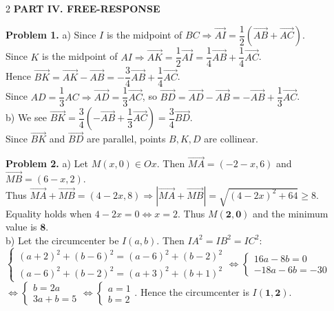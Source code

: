 \documentclass[10pt,a4paper]{article}
\begin{document}
\begin{multicols}{2}
\textbf{\color{accent}PART IV. FREE-RESPONSE}

\textbf{Problem 1.}
a) Since $I$ is the midpoint of $BC \Rightarrow \vec{AI} = \dfrac{1}{2}(\vec{AB} + \vec{AC})$.\\
Since $K$ is the midpoint of $AI \Rightarrow \vec{AK} = \dfrac{1}{2}\vec{AI} = \dfrac{1}{4}\vec{AB} + \dfrac{1}{4}\vec{AC}$.\\
Hence $\vec{BK} = \vec{AK} - \vec{AB} = -\dfrac{3}{4}\vec{AB} + \dfrac{1}{4}\vec{AC}$.\\
Since $AD = \dfrac{1}{3}AC \Rightarrow \vec{AD} = \dfrac{1}{3}\vec{AC}$, so $\vec{BD} = \vec{AD} - \vec{AB} = -\vec{AB} + \dfrac{1}{3}\vec{AC}$.\\
b) We see $\vec{BK} = \dfrac{3}{4}\left(-\vec{AB} + \dfrac{1}{3}\vec{AC}\right) = \dfrac{3}{4}\vec{BD}$.\\
Since $\vec{BK}$ and $\vec{BD}$ are parallel, points $B, K, D$ are collinear.

\textbf{Problem 2.}
a) Let $M(x, 0) \in Ox$. Then $\vec{MA} = (-2 - x, 6)$ and $\vec{MB} = (6 - x, 2)$.\\
Thus $\vec{MA} + \vec{MB} = (4 - 2x, 8) \Rightarrow |\vec{MA} + \vec{MB}| = \sqrt{(4 - 2x)^2 + 64} \ge 8$.\\
Equality holds when $4 - 2x = 0 \Leftrightarrow x = 2$. Thus $M(\mathbf{2}, \mathbf{0})$ and the minimum value is $\mathbf{8}$.\\
b) Let the circumcenter be $I(a, b)$. Then $IA^2 = IB^2 = IC^2$:\\
$\begin{cases} (a + 2)^2 + (b - 6)^2 = (a - 6)^2 + (b - 2)^2 \\ (a - 6)^2 + (b - 2)^2 = (a + 3)^2 + (b + 1)^2 \end{cases} \Leftrightarrow \begin{cases} 16a - 8b = 0 \\ -18a - 6b = -30 \end{cases}$\\
$\Leftrightarrow \begin{cases} b = 2a \\ 3a + b = 5 \end{cases} \Leftrightarrow \begin{cases} a = 1 \\ b = 2 \end{cases}$. Hence the circumcenter is $I(\mathbf{1}, \mathbf{2})$.


\end{multicols}
\end{document}

